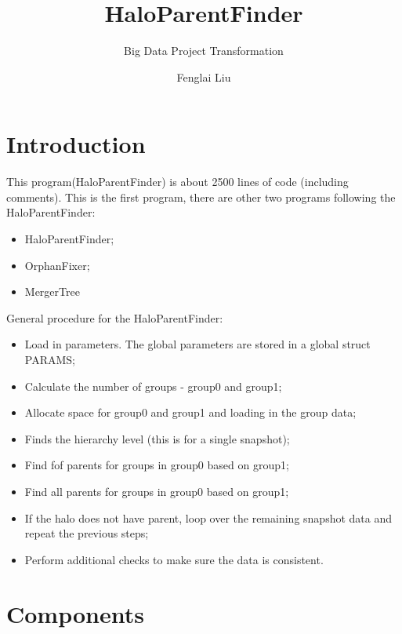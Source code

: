 \documentclass[notheorems, aspectratio=54]{beamer}
\title[Halo Parent Finder]{HaloParentFinder}
\subtitle{Big Data Project Transformation}
\author{Fenglai Liu}
\institute[ACCRE]{fenglai@accre.vanderbilt.edu}
\begin{document}
\begin{frame}
    \titlepage
\end{frame}

\section{Introduction}
\begin{frame}

This program(HaloParentFinder) is about 2500 lines of code (including comments). 
This is the first program, there are other two programs following the HaloParentFinder:
\begin{itemize}
 \item HaloParentFinder;
 \item OrphanFixer;
 \item MergerTree
\end{itemize}

\end{frame}

\begin{frame}

General procedure for the HaloParentFinder:
\begin{itemize}
 \item Load in parameters. The global parameters are stored in a global struct PARAMS;
 \item Calculate the number of groups - group0 and group1;
 \item Allocate space for group0 and group1 and loading in the group data; 
 \item Finds the hierarchy level (this is for a single snapshot);
 \item Find fof parents for groups in group0 based on group1;
 \item Find all parents for groups in group0 based on group1;
 \item If the halo does not have parent, loop over the remaining snapshot data and repeat the previous steps;
 \item Perform additional checks to make sure the data is consistent.
\end{itemize}


\end{frame}


\section{Components}
\end{document}
